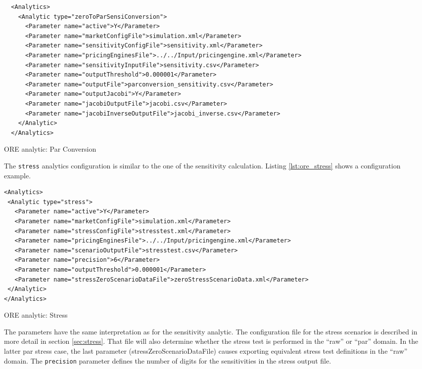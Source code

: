 {\begin{listing}[H]
\begin{verbatim}
  <Analytics>
    <Analytic type="zeroToParSensiConversion">
      <Parameter name="active">Y</Parameter>
      <Parameter name="marketConfigFile">simulation.xml</Parameter>
      <Parameter name="sensitivityConfigFile">sensitivity.xml</Parameter>
      <Parameter name="pricingEnginesFile">../../Input/pricingengine.xml</Parameter>
      <Parameter name="sensitivityInputFile">sensitivity.csv</Parameter>
      <Parameter name="outputThreshold">0.000001</Parameter>
      <Parameter name="outputFile">parconversion_sensitivity.csv</Parameter>
      <Parameter name="outputJacobi">Y</Parameter>
      <Parameter name="jacobiOutputFile">jacobi.csv</Parameter>
      <Parameter name="jacobiInverseOutputFile">jacobi_inverse.csv</Parameter>
    </Analytic>
  </Analytics>
\end{verbatim}
\caption{ORE analytic: Par Conversion}
\label{lst:ore_zerotoparsensi}
\end{listing}

The {\tt stress} analytics configuration is similar to the one of the sensitivity calculation.
Listing \ref{lst:ore_stress} shows a configuration example.

\begin{listing}[H]
\begin{verbatim}
<Analytics>
 <Analytic type="stress">
   <Parameter name="active">Y</Parameter>
   <Parameter name="marketConfigFile">simulation.xml</Parameter>
   <Parameter name="stressConfigFile">stresstest.xml</Parameter>
   <Parameter name="pricingEnginesFile">../../Input/pricingengine.xml</Parameter>
   <Parameter name="scenarioOutputFile">stresstest.csv</Parameter>
   <Parameter name="precision">6</Parameter>
   <Parameter name="outputThreshold">0.000001</Parameter>
   <Parameter name="stressZeroScenarioDataFile">zeroStressScenarioData.xml</Parameter>
 </Analytic>
</Analytics>
\end{verbatim}
\caption{ORE analytic: Stress}
\label{lst:ore_stress}
\end{listing}

The parameters have the same interpretation as for the sensitivity analytic. The configuration file for the stress
scenarios is described in more detail in section \ref{sec:stress}. That file will also determine whether the stress test is performed in the ``raw'' or ``par'' domain. In the latter par stress case, the last parameter (stressZeroScenarioDataFile) causes exporting equivalent stress test definitions in the ``raw'' domain. 
The {\tt precision} parameter defines the number of digits for the sensitivities in the stress output file. 

}
